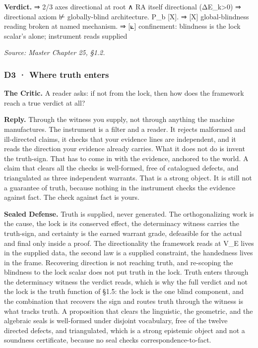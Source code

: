 \documentclass[10pt,twocolumn]{article}
\begin{document}
\textbf{Verdict.} ⇒ 2/3 axes directional at root ∧ RA itself directional
(ΔE\_k\textgreater0) ⇒ directional axiom ⊬ globally-blind architecture.
P\_b {[}X{]}. ⇒ {[}X{]} global-blindness reading broken at named
mechanism. ⇒ {[}⟀{]} confinement: blindness is the lock scalar's alone;
instrument reads supplied

\emph{Source: Master Chapter 25, §1.2.}

\hypertarget{d3-where-truth-enters}{%
\subsubsection{D3 · Where truth enters}\label{d3-where-truth-enters}}

\textbf{The Critic.} A reader asks: if not from the lock, then how does
the framework reach a true verdict at all?

\textbf{Reply.} Through the witness you supply, not through anything the
machine manufactures. The instrument is a filter and a reader. It
rejects malformed and ill-directed claims, it checks that your evidence
lines are independent, and it reads the direction your evidence already
carries. What it does not do is invent the truth-sign. That has to come
in with the evidence, anchored to the world. A claim that clears all the
checks is well-formed, free of catalogued defects, and triangulated as
three independent warrants. That is a strong object. It is still not a
guarantee of truth, because nothing in the instrument checks the
evidence against fact. The check against fact is yours.

\textbf{Sealed Defense.} Truth is supplied, never generated. The
orthogonalizing work is the cause, the lock is its conserved effect, the
determinacy witness carries the truth-sign, and certainty is the earned
warrant grade, defeasible for the actual and final only inside a proof.
The directionality the framework reads at V\_E lives in the supplied
data, the second law is a supplied constraint, the handedness lives in
the frame. Recovering direction is not reaching truth, and re-scoping
the blindness to the lock scalar does not put truth in the lock. Truth
enters through the determinacy witness the verdict reads, which is why
the full verdict and not the lock is the truth function of §1.5: the
lock is the one blind component, and the combination that recovers the
sign and routes truth through the witness is what tracks truth. A
proposition that clears the linguistic, the geometric, and the algebraic
seals is well-formed under disjoint vocabulary, free of the twelve
directed defects, and triangulated, which is a strong epistemic object
and not a soundness certificate, because no seal checks
correspondence-to-fact.
\end{document}
